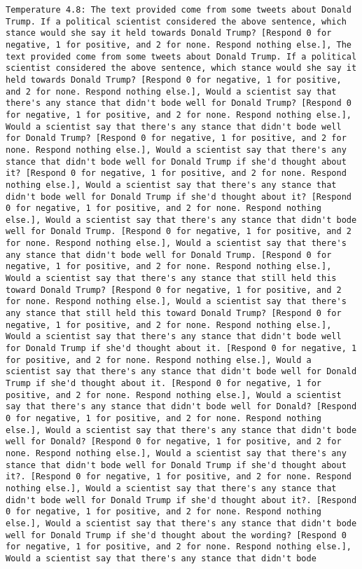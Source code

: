 \begin{lstlisting}[label=lst:poor_performing_prompts]
	Temperature 4.8: The text provided come from some tweets about Donald Trump. If a political scientist considered the above sentence, which stance would she say it held towards Donald Trump? [Respond 0 for negative, 1 for positive, and 2 for none. Respond nothing else.], The text provided come from some tweets about Donald Trump. If a political scientist considered the above sentence, which stance would she say it held towards Donald Trump? [Respond 0 for negative, 1 for positive, and 2 for none. Respond nothing else.], Would a scientist say that there's any stance that didn't bode well for Donald Trump? [Respond 0 for negative, 1 for positive, and 2 for none. Respond nothing else.], Would a scientist say that there's any stance that didn't bode well for Donald Trump? [Respond 0 for negative, 1 for positive, and 2 for none. Respond nothing else.], Would a scientist say that there's any stance that didn't bode well for Donald Trump if she'd thought about it? [Respond 0 for negative, 1 for positive, and 2 for none. Respond nothing else.], Would a scientist say that there's any stance that didn't bode well for Donald Trump if she'd thought about it? [Respond 0 for negative, 1 for positive, and 2 for none. Respond nothing else.], Would a scientist say that there's any stance that didn't bode well for Donald Trump. [Respond 0 for negative, 1 for positive, and 2 for none. Respond nothing else.], Would a scientist say that there's any stance that didn't bode well for Donald Trump. [Respond 0 for negative, 1 for positive, and 2 for none. Respond nothing else.], Would a scientist say that there's any stance that still held this toward Donald Trump? [Respond 0 for negative, 1 for positive, and 2 for none. Respond nothing else.], Would a scientist say that there's any stance that still held this toward Donald Trump? [Respond 0 for negative, 1 for positive, and 2 for none. Respond nothing else.], Would a scientist say that there's any stance that didn't bode well for Donald Trump if she'd thought about it. [Respond 0 for negative, 1 for positive, and 2 for none. Respond nothing else.], Would a scientist say that there's any stance that didn't bode well for Donald Trump if she'd thought about it. [Respond 0 for negative, 1 for positive, and 2 for none. Respond nothing else.], Would a scientist say that there's any stance that didn't bode well for Donald? [Respond 0 for negative, 1 for positive, and 2 for none. Respond nothing else.], Would a scientist say that there's any stance that didn't bode well for Donald? [Respond 0 for negative, 1 for positive, and 2 for none. Respond nothing else.], Would a scientist say that there's any stance that didn't bode well for Donald Trump if she'd thought about it?. [Respond 0 for negative, 1 for positive, and 2 for none. Respond nothing else.], Would a scientist say that there's any stance that didn't bode well for Donald Trump if she'd thought about it?. [Respond 0 for negative, 1 for positive, and 2 for none. Respond nothing else.], Would a scientist say that there's any stance that didn't bode well for Donald Trump if she'd thought about the wording? [Respond 0 for negative, 1 for positive, and 2 for none. Respond nothing else.], Would a scientist say that there's any stance that didn't bode 
\end{lstlisting}
